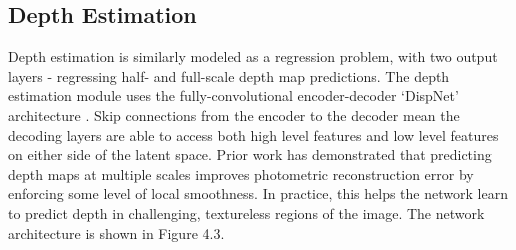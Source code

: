 

\subsection{Depth Estimation}

Depth estimation is similarly modeled as a regression problem, with two output layers - regressing half- and full-scale depth map predictions. The depth estimation module uses the fully-convolutional encoder-decoder `DispNet' architecture \cite{mayer2015dispnet}. Skip connections from the encoder to the decoder mean the decoding layers are able to access both high level features and low level features on either side of the latent space. Prior work \cite{zhou2017unsupervised} has demonstrated that predicting depth maps at multiple scales improves photometric reconstruction error by enforcing some level of local smoothness. In practice, this helps the network learn to predict depth in challenging, textureless regions of the image. The network architecture is shown in Figure 4.3.

